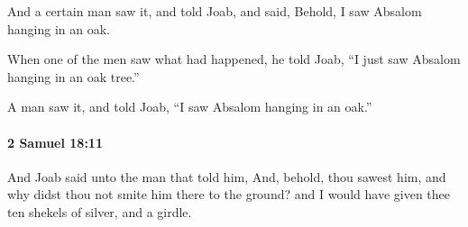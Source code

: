 			\begin{versebox}
					\item[BHS] 
					\item[ASV] And a certain man saw it, and told Joab, and said, Behold, I saw Absalom hanging in an oak.
					\item[NIV] When one of the men saw what had happened, he told Joab, “I just saw Absalom hanging in an oak tree.”
					\item[NRSV] A man saw it, and told Joab, “I saw Absalom hanging in an oak.”
			\end{versebox}

		\paragraph{2 Samuel 18:11} %
			\label{2SAMUEL-18-11}

			And Joab said unto the man that told him, And, behold, thou sawest him, and why didst thou not smite him there to the ground? and I would have given thee ten shekels of silver, and a girdle.

